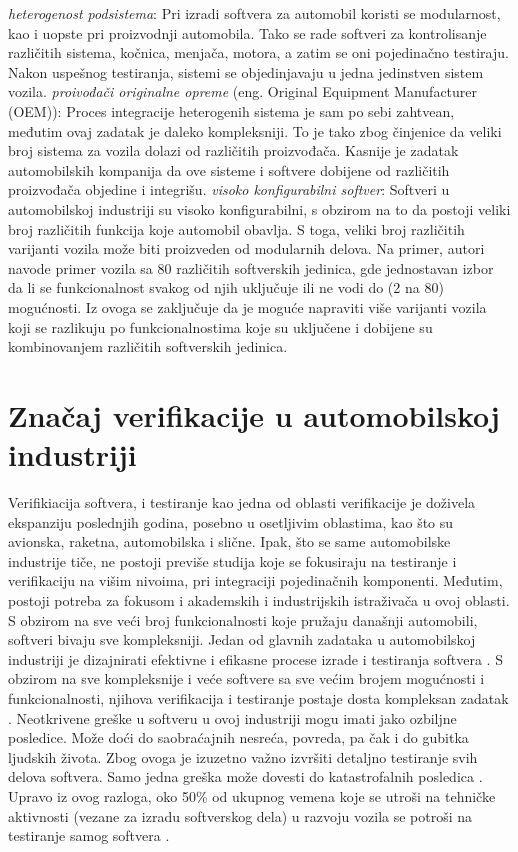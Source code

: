\documentclass{article}
\begin{document}
\bigbreak
\textit{heterogenost podsistema}: Pri izradi softvera za automobil koristi se modularnost, kao i uopste pri proizvodnji automobila. Tako se rade softveri za kontrolisanje različitih sistema, kočnica, menjača, motora, a zatim se oni pojedinačno testiraju. Nakon uspešnog testiranja, sistemi se objedinjavaju u jedna jedinstven sistem vozila. 
\bigbreak
\textit{proivođači originalne opreme} (eng. Original Equipment Manufacturer (OEM)): Proces integracije heterogenih sistema je sam po sebi zahtvean, međutim ovaj zadatak je daleko kompleksniji. To je tako zbog činjenice da veliki broj sistema za vozila dolazi od različitih proizvođača. Kasnije je zadatak automobilskih kompanija da ove sisteme i softvere dobijene od različitih proizvođača objedine i integrišu.
\bigbreak
\textit{visoko konfigurabilni softver}: Softveri u automobilskoj industriji su visoko konfigurabilni, s obzirom na to da postoji veliki broj različitih funkcija koje automobil obavlja. S toga, veliki broj različitih varijanti vozila može biti proizveden od modularnih delova. Na primer, autori \cite{knjiga27} navode primer vozila sa 80 različitih softverskih jedinica, gde jednostavan izbor da li se funkcionalnost svakog od njih uključuje ili ne vodi do (2 na 80) mogućnosti. Iz ovoga se zaključuje da je moguće napraviti više varijanti vozila koji se razlikuju po funkcionalnostima koje su uključene i dobijene su kombinovanjem različitih softverskih jedinica.
\bigbreak
\section{Značaj verifikacije u automobilskoj industriji}

Verifikiacija softvera, i testiranje kao jedna od oblasti verifikacije je doživela ekspanziju poslednjih godina, posebno u osetljivim oblastima, kao što su avionska, raketna, automobilska i slične. Ipak, što se same automobilske industrije tiče, ne postoji previše studija koje se fokusiraju na testiranje i verifikaciju na višim nivoima, pri integraciji pojedinačnih komponenti. Međutim, postoji potreba za fokusom i akademskih i industrijskih istraživača u ovoj oblasti.
\bigbreak
S obzirom na sve veći broj funkcionalnosti koje pružaju današnji automobili, softveri bivaju sve kompleksniji. Jedan od glavnih zadataka u automobilskoj industriji je dizajnirati efektivne i efikasne procese izrade i testiranja softvera \cite{knjiga10}. S obzirom na sve kompleksnije i veće softvere sa sve većim brojem mogućnosti i funkcionalnosti, njihova verifikacija i testiranje postaje dosta kompleksan zadatak \cite{knjiga11}. Neotkrivene greške u softveru u ovoj industriji mogu imati jako ozbiljne posledice. Može doći do saobraćajnih nesreća, povreda, pa čak i do gubitka ljudskih života. Zbog ovoga je izuzetno važno izvršiti detaljno testiranje svih delova softvera. Samo jedna greška može dovesti do katastrofalnih posledica \cite{knjiga12}. Upravo iz ovog razloga, oko 50\% od ukupnog vemena koje se utroši na tehničke aktivnosti (vezane za izradu softverskog dela) u razvoju vozila se potroši na testiranje samog softvera \cite{knjiga13}.
\end{document}
